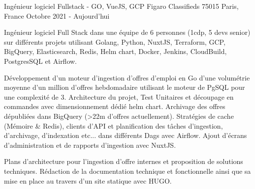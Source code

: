 \cventry
{Ingénieur logiciel Fullstack - GO, VueJS, GCP} %
{Figaro Classifieds} %
{75015 Paris, France} %
{Octobre 2021 - Aujourd'hui} %
{
    \begin{cvitems} %
        \item
        {
            Ingénieur logiciel Full Stack dans une équipe de 6 personnes (1cdp, 5 devs senior) sur différents projets
            utilisant Golang, Python, NuxtJS, Terraform, GCP, BigQuery, Elasticsearch, Redis, Helm chart, Docker, Jenkins,
            CloudBuild, PostgresSQL et Airflow.
        }
        \item
        {
            Développement d'un moteur d'ingestion d'offres d'emploi en Go d'une volumétrie moyenne d'un million d'offres
            hebdomadaire utilisant le moteur de PgSQL pour une complexité de 3. Architecture du projet, Test Unitaires et
            découpage en commandes avec dimensionnement dédié helm chart. Archivage des offres dépubliées dans BigQuery
            (>22m d'offres actuellement). Stratégies de cache (Mémoire \& Redis), clients d'API et planification
            des tâches d'ingestion, d'archivage, d'indexation etc... dans différents Dags avec Airflow.
            Ajout d'écrans d'administration et de rapports d'ingestion avec NuxtJS.
        }
        \item
        {
            Plans d'architecture pour l'ingestion d'offre internes et proposition de solutions techniques. Rédaction de
            la documentation technique et fonctionnelle ainsi que sa mise en place au travers d'un site statique avec HUGO.
        }
    \end{cvitems}
}
